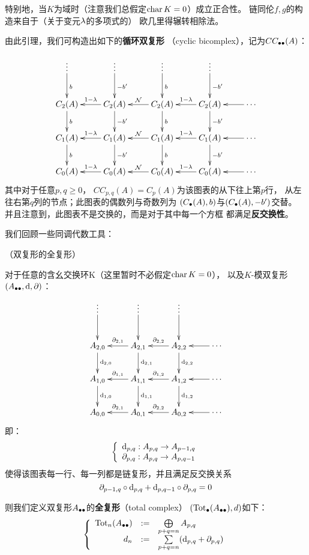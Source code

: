特别地，当$K$为域时（注意我们总假定$\operatorname{char} K=0$）成立正合性。
链同伦$f,g$的构造来自于（关于变元$\lambda$的多项式的）
欧几里得辗转相除法。


由此引理，我们可构造出如下的\textbf{循环双复形}
（cyclic bicomplex），记为$CC_{\bullet\bullet}(A)$：

$$\xymatrix{
   \vdots \ar[d]^b
  &\vdots \ar[d]^{-b'}
  &\vdots \ar[d]^b
  &\vdots \ar[d]^{-b'}
  &
\\
   C_2(A) \ar[d]^b
  &C_2(A) \ar[d]^{-b'} \ar[l]_{1-\lmd}
  &C_2(A) \ar[d]^b     \ar[l]_{\mcalN}
  &C_2(A) \ar[d]^{-b'} \ar[l]_{1-\lmd}
  &\cdots              \ar[l]
\\
   C_1(A) \ar[d]^b
  &C_1(A) \ar[d]^{-b'} \ar[l]_{1-\lmd}
  &C_1(A) \ar[d]^b     \ar[l]_{\mcalN}
  &C_1(A) \ar[d]^{-b'} \ar[l]_{1-\lmd}
  &\cdots              \ar[l]
\\
   C_0(A)
  &C_0(A)   \ar[l]_{1-\lmd}
  &C_0(A)   \ar[l]_{\mcalN}
  &C_0(A)   \ar[l]_{1-\lmd}
  &\cdots   \ar[l]
}$$
其中对于任意$p,q\geq 0$，
$CC_{p,q}(A)=C_p(A)$为该图表的从下往上第$p$行，
从左往右第$q$列的节点；此图表的偶数列与奇数列为
$(C_{\bullet} (A),b)$与$(C_{\bullet} (A),-b')$交替。
并且注意到，此图表不是交换的，而是对于其中每一个方框
都满足\textbf{反交换性}。\vs

我们回顾一些同调代数工具：

\begin{definition}（双复形的全复形）

对于任意的含幺交换环K（这里暂时不必假定$\operatorname{char} K=0$），
以及$K$-模双复形$(A_{\bullet\bullet},\mathrm{d},\partial)$：
$$\xymatrix{
    \vdots  \ar[d]
  & \vdots  \ar[d]
  & \vdots  \ar[d]
  &
\\
    A_{2,0} \ar[d]^{\td_{2,0}}
  & A_{2,1} \ar[d]^{\td_{2,1}}  \ar[l]_{\p_{2,1}}
  & A_{2,2} \ar[d]^{\td_{2,2}}  \ar[l]_{\p_{2,2}}
  & \cdots                      \ar[l]
\\
    A_{1,0} \ar[d]^{\td_{1,0}}
  & A_{1,1} \ar[d]^{\td_{1,1}}  \ar[l]_{\p_{1,1}}
  & A_{1,2} \ar[d]^{\td_{1,2}}  \ar[l]_{\p_{1,2}}
  & \cdots                      \ar[l]
\\
    A_{0,0}
  & A_{0,1}   \ar[l]_{\p_{2,1}}
  & A_{0,2}   \ar[l]_{\p_{2,2}}
  & \cdots    \ar[l]
}$$
即：
$$\left\{\begin{array}{l}
\mathrm{d}_{p,q}:A_{p,q}\to A_{p-1,q}\\
\partial_{p,q }:A_{p,q}\to A_{p,q-1}
\end{array}\right.
$$
使得该图表每一行、每一列都是链复形，并且满足反交换关系
$$\partial_{p-1,q}\circ\mathrm{d}_{p,q}+\mathrm{d}_{p,q-1}\circ\partial_{p,q}=0$$

则我们定义双复形$A_{\bullet\bullet}$的\textbf{全复形}（total complex）
$(\operatorname{Tot}_{\bullet}(A_{\bullet\bullet}),d)$如下：
$$\left\{\begin{array}{rcl}
\operatorname{Tot}_n(A_{\bullet\bullet})&:=&\bigoplus\limits_{p+q=n}A_{p,q}\\
d_n&:=&\sum\limits_{p+q=n}(\mathrm{d}_{p,q}+\partial_{p,q})
\end{array}\right.$$
\end{definition}

